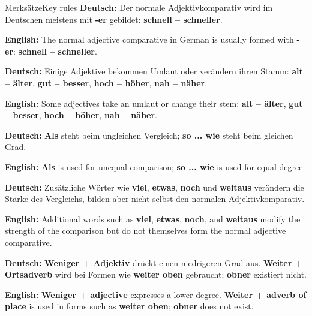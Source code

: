 \documentclass[a4paper,11pt]{article}
\newcommand{\GermanText}[1]{\textbf{Deutsch: }#1\par}
\newcommand{\EnglishText}[1]{{\small\color{SoftGray}\textbf{English: }#1\par}}
\begin{document}
      \begin{grammarentry}{Merksätze}{Key rules}
         \GermanText{Der normale Adjektivkomparativ wird im Deutschen meistens mit \textbf{-er} gebildet: \textbf{schnell -- schneller}.}
         \EnglishText{The normal adjective comparative in German is usually formed with \textbf{-er}: \textbf{schnell -- schneller}.}

         \GermanText{Einige Adjektive bekommen Umlaut oder verändern ihren Stamm: \textbf{alt -- älter}, \textbf{gut -- besser}, \textbf{hoch -- höher}, \textbf{nah -- näher}.}
         \EnglishText{Some adjectives take an umlaut or change their stem: \textbf{alt -- älter}, \textbf{gut -- besser}, \textbf{hoch -- höher}, \textbf{nah -- näher}.}

         \GermanText{\textbf{Als} steht beim ungleichen Vergleich; \textbf{so ... wie} steht beim gleichen Grad.}
         \EnglishText{\textbf{Als} is used for unequal comparison; \textbf{so ... wie} is used for equal degree.}

         \GermanText{Zusätzliche Wörter wie \textbf{viel}, \textbf{etwas}, \textbf{noch} und \textbf{weitaus} verändern die Stärke des Vergleichs, bilden aber nicht selbst den normalen Adjektivkomparativ.}
         \EnglishText{Additional words such as \textbf{viel}, \textbf{etwas}, \textbf{noch}, and \textbf{weitaus} modify the strength of the comparison but do not themselves form the normal adjective comparative.}

         \GermanText{\textbf{Weniger + Adjektiv} drückt einen niedrigeren Grad aus. \textbf{Weiter + Ortsadverb} wird bei Formen wie \textbf{weiter oben} gebraucht; \textbf{obner} existiert nicht.}
         \EnglishText{\textbf{Weniger + adjective} expresses a lower degree. \textbf{Weiter + adverb of place} is used in forms such as \textbf{weiter oben}; \textbf{obner} does not exist.}
      \end{grammarentry}
\end{document}
